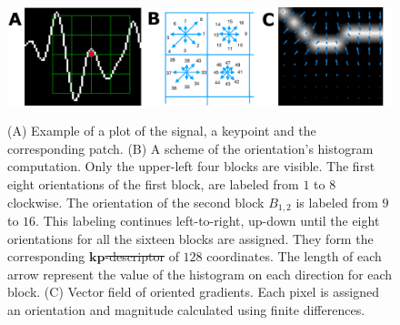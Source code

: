 \documentclass[utf8]{frontiersSCNS} %
\providecommand{\DIFaddtex}[1]{{\protect\color{blue}\uwave{#1}}} %
\providecommand{\DIFdeltex}[1]{{\protect\color{red}\sout{#1}}}                      %
\providecommand{\DIFaddFL}[1]{\DIFadd{#1}} %
\providecommand{\DIFdelFL}[1]{\DIFdel{#1}} %
\providecommand{\DIFaddbeginFL}{} %
\providecommand{\DIFaddendFL}{} %
\providecommand{\DIFdelbeginFL}{} %
\providecommand{\DIFdelendFL}{} %
\providecommand{\DIFadd}[1]{\texorpdfstring{\DIFaddtex{#1}}{#1}} %
\providecommand{\DIFdel}[1]{\texorpdfstring{\DIFdeltex{#1}}{}} %
\begin{document}
\begin{figure}[h!]
\centering
\DIFaddendFL \includegraphics[width=16cm]{gradients.png}\label{samplegradients}
\caption{ (A) Example of a plot of the signal, a keypoint and the corresponding patch. (B) A scheme of the orientation's histogram computation.  Only the upper-left four blocks are visible.  The first eight orientations of the first block, are labeled from $1$ to $8$ clockwise. The orientation of the second block $ B_{1,2} $ is labeled from $9$ to $16$.  This labeling continues left-to-right, up-down until the eight orientations for all the sixteen blocks are assigned. They form the corresponding \DIFdelbeginFL \DIFdelFL{$\mathbf{kp}$-descriptor }\DIFdelendFL \DIFaddbeginFL \DIFaddFL{descriptor }\DIFaddendFL of $128$ coordinates.  The length of each arrow represent the value of the histogram on each direction for each block. (C) Vector field of oriented gradients.  Each pixel is assigned an orientation and magnitude calculated  using finite differences. }
\label{fig:sampledescriptor}
\end{figure}
\end{document}
